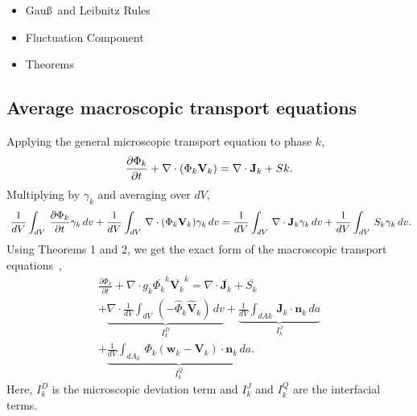 \documentclass[11pt]{article}
\begin{document}
\begin{itemize}
\begin{itemize}
						\begin{equation}
							\overline{\psi_{k}}^{V} = \frac{1}{V} \int_{V} \psi_{k}(\mathbf{x} + \mathbf{\eta}, t) X_{k}(\mathbf{x} + \mathbf{\eta}, t) d\mathbf{x}_{\eta},\\
						\end{equation}
						\begin{equation}
							\overline{\psi_{k}}^{k} = \frac{1}{V_{k}} \int_{V} \psi_{k}(\mathbf{x} + \mathbf{\eta}, t) X_{k}(\mathbf{x} + \mathbf{\eta}, t) d\mathbf{x}_{\eta}
						\end{equation}
				\item these averages are linearly related as, $\overline{\psi_{k}}^{V} = g_{k} \overline{\psi_{k}}^{k}$
			\end{itemize}
	\item Gau\ss~and Leibnitz Rules
	\item Fluctuation Component
	\item Theorems
\end{itemize}
\subsection{Average macroscopic transport equations}
Applying the general microscopic transport equation to phase $k$,~\newline
\begin{equation}
	\frac{\partial \Phi_{k}}{\partial t} + \nabla \cdot (\Phi_{k}\mathbf{V}_{k}) = \nabla \cdot \mathbf{J}_{k} + S{k}.\\
\end{equation}
Multiplying by $\gamma_{k}$ and averaging over $dV$,~\newline
\begin{equation}\
	\frac{1}{dV}\int_{dV}\,\frac{\partial \Phi_{k}}{\partial t}\gamma_{k}\,dv + \frac{1}{dV}\int_{dV}\,\nabla \cdot (\Phi_{k} \mathbf{V}_{k}) \gamma_{k}\,dv
		= \frac{1}{dV}\int_{dV}\,\nabla \cdot \mathbf{J}_{k} \gamma_{k}\,dv + \frac{1}{dV}\int_{dV}\,S_{k}\gamma_{k}\,dv.\\
\end{equation}
Using Theorems 1 and 2, we get the exact form of the macroscopic transport equations~\cite{bloschVolumeAveragedMacroscopicTransport1997},~\newline
\begin{multline} \label{macro_balance}
	\frac{\partial \Phi_{k}}{\partial t} + \nabla \cdot g_{k}\overline{\Phi_k}^{k} \overline{\mathbf{V}_{k}}^{k} = \nabla \cdot \overline{\mathbf{J}_{k}} + \overline{S_{k}}\\
		+ \underbrace{\nabla \cdot \frac{1}{dV}\int_{dV}\,(-\hat{\Phi}_{k} \hat{\mathbf{V}}_{k})\,dv}_{I_{k}^{D}} + \underbrace{\frac{1}{dV}\int_{dA{k}}\,\mathbf{J}_{k}\cdot\mathbf{n}_{k}\,da}_{I_{k}^{J}}\\
		+ \underbrace{\frac{1}{dV}\int_{dA_{k}}\, \Phi_{k}(\mathbf{w}_{k} - \mathbf{V}_{k}) \cdot \mathbf{n}_{k}\,da}_{I_{k}^{Q}}.
\end{multline}
Here, $I_{k}^{D}$ is the microscopic deviation term and $I_{k}^{J}$ and $I_{k}^{Q}$ are the interfacial terms.
\end{document}
